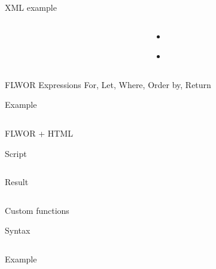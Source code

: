 \documentclass[sans]{beamer}
\begin{document}
\begin{frame}{XML example}
	\begin{columns}
		\begin{column}{0.45\linewidth}
			\inputminted[fontsize=\tiny]{xml}{codes/ex2.xml}
		\end{column}
		\begin{column}{0.55\linewidth}
			\begin{itemize}
				\item \inputminted[fontsize=\tiny]{xquery}{codes/ex3.xq}
				\item \inputminted[fontsize=\tiny]{xquery}{codes/ex4.xq}
			\end{itemize}
		\end{column}
	\end{columns}
\end{frame}

\begin{frame}{FLWOR Expressions}
	For, Let, Where, Order by, Return

	\vspace{1cm}

	\begin{block}{Example}
		\inputminted{xquery}{codes/ex5.xq}
	\end{block}
\end{frame}

\begin{frame}{FLWOR + HTML}
	\begin{block}{Script}
		\inputminted[fontsize=\footnotesize]{xquery}{codes/ex6.html}
	\end{block}

	\begin{block}{Result}
		\inputminted[fontsize=\footnotesize]{html}{codes/ex7.html}
	\end{block}
\end{frame}

\begin{frame}{Custom functions}
	\begin{block}{Syntax}
		\inputminted[fontsize=\tiny]{xquery}{codes/ex8.xq}
	\end{block}
	\begin{block}{Example}
		\inputminted[fontsize=\tiny]{xquery}{codes/ex9.xq}
	\end{block}
\end{frame}
\end{document}
